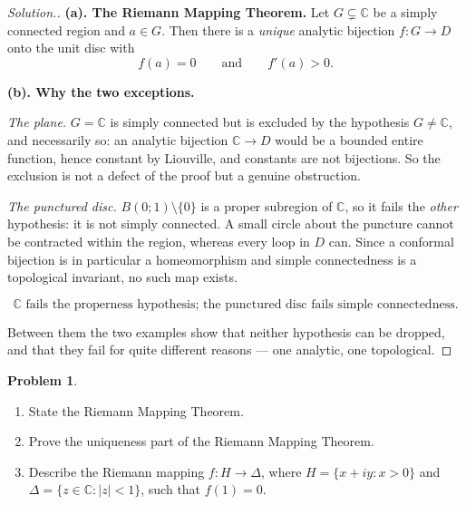 \documentclass[11pt,a4paper]{article}
\theoremstyle{definition}
\newtheorem{problemx}{Problem}[section]
\newenvironment{problem}{\begin{problemx}}{\end{problemx}}
\newenvironment{solution}
  {\renewcommand{\qedsymbol}{}\begin{proof}[\textit{Solution}.]}
  {\end{proof}}
\begin{document}
\begin{solution}
\textbf{(a). The Riemann Mapping Theorem.} Let $G \subsetneq \mathbb{C}$ be a
simply connected region and $a \in G$. Then there is a \emph{unique} analytic
bijection $f : G \rightarrow D$ onto the unit disc with
$$f(a) = 0 \qquad\text{and}\qquad f'(a) > 0 .$$

\textbf{(b). Why the two exceptions.}

\emph{The plane.} $G = \mathbb{C}$ is simply connected but is excluded by the
hypothesis $G \neq \mathbb{C}$, and necessarily so: an analytic bijection
$\mathbb{C} \rightarrow D$ would be a bounded entire function, hence constant by
Liouville, and constants are not bijections. So the exclusion is not a defect of
the proof but a genuine obstruction.

\emph{The punctured disc.} $B(0;1)\setminus\{0\}$ is a proper subregion of
$\mathbb{C}$, so it fails the \emph{other} hypothesis: it is not simply connected.
A small circle about the puncture cannot be contracted within the region, whereas
every loop in $D$ can. Since a conformal bijection is in particular a
homeomorphism and simple connectedness is a topological invariant, no such map
exists.

$$\boxed{\mathbb{C} \text{ fails the properness hypothesis; the punctured disc
fails simple connectedness.}}$$

Between them the two examples show that neither hypothesis can be dropped, and
that they fail for quite different reasons --- one analytic, one topological.
\end{solution}


\begin{problem}
\begin{enumerate}
\item[(a).] State the Riemann Mapping Theorem.
\item[(b).] Prove the uniqueness part of the Riemann Mapping Theorem.
\item[(c).] Describe the Riemann mapping $f : H \rightarrow \Delta$, where
$H = \{x + iy : x > 0\}$ and
$\Delta = \{z \in \mathbb{C} : \left|z\right| < 1\}$, such that $f(1) = 0$.
\end{enumerate}
\end{problem}
\end{document}
